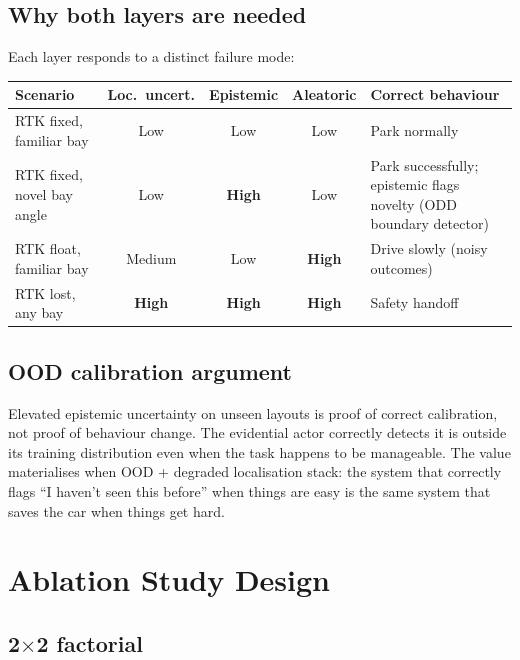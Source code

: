 \documentclass[11pt,a4paper]{article}
\begin{document}
\subsection{Why both layers are needed}

Each layer responds to a distinct failure mode:

\begin{center}
\begin{tabular}{lcccp{4.5cm}}
\toprule
Scenario & Loc.\ uncert. & Epistemic & Aleatoric & Correct behaviour \\
\midrule
RTK fixed, familiar bay & Low & Low & Low & Park normally \\
RTK fixed, novel bay angle & Low & \textbf{High} & Low &
  Park successfully; epistemic flags novelty (ODD boundary detector) \\
RTK float, familiar bay & Medium & Low & \textbf{High} &
  Drive slowly (noisy outcomes) \\
RTK lost, any bay & \textbf{High} & \textbf{High} & \textbf{High} &
  Safety handoff \\
\bottomrule
\end{tabular}
\end{center}

\subsection{OOD calibration argument}

Elevated epistemic uncertainty on unseen layouts is proof of correct
calibration, not proof of behaviour change. The evidential actor correctly
detects it is outside its training distribution even when the task happens
to be manageable. The value materialises when OOD + degraded localisation
stack: the system that correctly flags ``I haven't seen this before'' when
things are easy is the same system that saves the car when things get hard.

\section{Ablation Study Design}

\subsection{2$\times$2 factorial}
\end{document}
